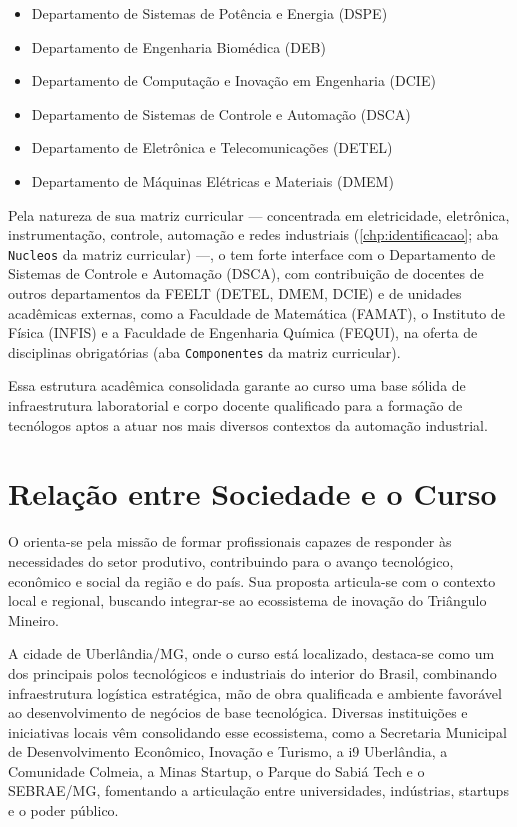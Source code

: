\begin{itemize}
    \item Departamento de Sistemas de Potência e Energia (DSPE)
    \item Departamento de Engenharia Biomédica (DEB)
    \item Departamento de Computação e Inovação em Engenharia (DCIE)
    \item Departamento de Sistemas de Controle e Automação (DSCA)
    \item Departamento de Eletrônica e Telecomunicações (DETEL)
    \item Departamento de Máquinas Elétricas e Materiais (DMEM)
\end{itemize}

Pela natureza de sua matriz curricular — concentrada em eletricidade, eletrônica, instrumentação, controle, automação e redes industriais (\autoref{chp:identificacao}; aba \texttt{Nucleos} da matriz curricular) —, o \ppccurso tem forte interface com o Departamento de Sistemas de Controle e Automação (DSCA), com contribuição de docentes de outros departamentos da FEELT (DETEL, DMEM, DCIE) e de unidades acadêmicas externas, como a Faculdade de Matemática (FAMAT), o Instituto de Física (INFIS) e a Faculdade de Engenharia Química (FEQUI), na oferta de disciplinas obrigatórias (aba \texttt{Componentes} da matriz curricular). %

Essa estrutura acadêmica consolidada garante ao curso uma base sólida de infraestrutura laboratorial e corpo docente qualificado para a formação de tecnólogos aptos a atuar nos mais diversos contextos da automação industrial.

\section{Relação entre Sociedade e o Curso}

O \ppccurso orienta-se pela missão de formar profissionais capazes de responder às necessidades do setor produtivo, contribuindo para o avanço tecnológico, econômico e social da região e do país. Sua proposta articula-se com o contexto local e regional, buscando integrar-se ao ecossistema de inovação do Triângulo Mineiro.

A cidade de Uberlândia/MG, onde o curso está localizado, destaca-se como um dos principais polos tecnológicos e industriais do interior do Brasil, combinando infraestrutura logística estratégica, mão de obra qualificada e ambiente favorável ao desenvolvimento de negócios de base tecnológica. Diversas instituições e iniciativas locais vêm consolidando esse ecossistema, como a Secretaria Municipal de Desenvolvimento Econômico, Inovação e Turismo, a i9 Uberlândia, a Comunidade Colmeia, a Minas Startup, o Parque do Sabiá Tech e o SEBRAE/MG, fomentando a articulação entre universidades, indústrias, startups e o poder público.


